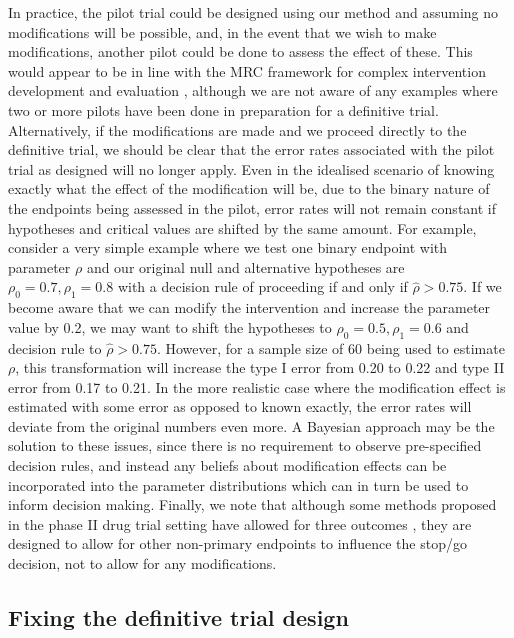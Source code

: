 \documentclass[AMA,STIX1COL]{WileyNJD-v2}
\begin{document}
In practice, the pilot trial could be designed using our method and assuming no modifications will be possible, and, in the event that we wish to make modifications, another pilot could be done to assess the effect of these. This would appear to be in line with the MRC framework for complex intervention development and evaluation \cite{Craig2008}, although we are not aware of any examples where two or more pilots have been done in preparation for a definitive trial. Alternatively, if the modifications are made and we proceed directly to the definitive trial, we should be clear that the error rates associated with the pilot trial as designed will no longer apply. Even in the idealised scenario of knowing exactly what the effect of the modification will be, due to the binary nature of the endpoints being assessed in the pilot, error rates will not remain constant if hypotheses and critical values are shifted by the same amount. For example, consider a very simple example where we test one binary endpoint with parameter $\rho$ and our original null and alternative hypotheses are $\rho_0 = 0.7, \rho_1 = 0.8$ with a decision rule of proceeding if and only if $\hat{\rho} > 0.75$. If we become aware that we can modify the intervention and increase the parameter value by 0.2, we may want to shift the hypotheses to $\rho_0 = 0.5, \rho_1 = 0.6$ and decision rule to $\hat{\rho} > 0.75$. However, for a sample size of 60 being used to estimate $\rho$, this transformation will increase the type I error from 0.20 to 0.22 and type II error from 0.17 to 0.21. In the more realistic case where the modification effect is estimated with some error as opposed to known exactly, the error rates will deviate from the original numbers even more. A Bayesian approach may be the solution to these issues, since there is no requirement to observe pre-specified decision rules, and instead any beliefs about modification effects can be incorporated into the parameter distributions which can in turn be used to inform decision making. Finally, we note that although some methods proposed in the phase II drug trial setting have allowed for three outcomes \cite{Sargent2001, Hong2007}, they are designed to allow for other non-primary endpoints to influence the stop/go decision, not to allow for any modifications.

\subsection{Fixing the definitive trial design}
\end{document}

